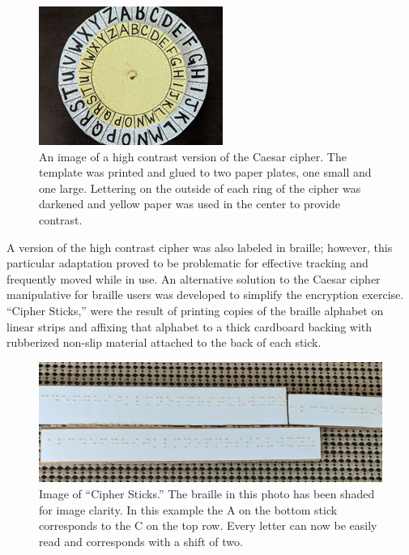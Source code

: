 \documentclass[11.5pt]{sig-alternate} %
\begin{document}
\begin{large}
\begin{figure}[!h]
    \centering
    \includegraphics[width=1\linewidth]{images/fig3.png}
    \caption{An image of a high contrast version of the Caesar cipher. The template was printed and glued to two paper plates, one small and one large. Lettering on the outside of each ring of the cipher was darkened and yellow paper was used in the center to provide contrast.}
\end{figure}

A version of the high contrast cipher was also labeled in braille; however, this particular adaptation proved to be problematic for effective tracking and frequently moved while in use. An alternative solution to the Caesar cipher manipulative for braille users was developed to simplify the encryption exercise. “Cipher Sticks,” were the result of printing copies of the braille alphabet on linear strips and affixing that alphabet to a thick cardboard  backing with rubberized non-slip material attached to the back of each stick. 

\begin{figure}[!h]
     \centering
     \includegraphics[width=1\linewidth]{images/fig4.jpg}
     \caption{Image of “Cipher Sticks.” The braille in this photo has been shaded for image clarity. In this example the A on the bottom stick corresponds to the C on the top row. Every letter can now be easily read and corresponds with a shift of two.}
 \end{figure} 


\end{large}
\end{document}
